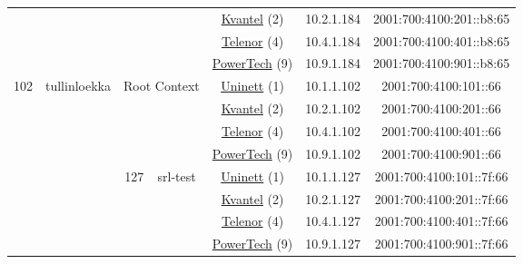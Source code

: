 \begin{small}
\begin{center}
\begin{longtable}{|c|c|c|c|c|c|c|c|}
  &  &  &  & \multicolumn{2}{|c|}{\tiny{\href{http://kvantel.no}{Kvantel} (2)}} & \tiny{10.2.1.184} & \tiny{2001:700:4100:201::b8:65} \\* \cline{5-5}\cline{6-6}\cline{7-7}\cline{8-8}
  &  &  &  & \multicolumn{2}{|c|}{\tiny{\href{https://www.telenor.no}{Telenor} (4)}} & \tiny{10.4.1.184} & \tiny{2001:700:4100:401::b8:65} \\* \cline{5-5}\cline{6-6}\cline{7-7}\cline{8-8}
  &  &  &  & \multicolumn{2}{|c|}{\tiny{\href{http://www.powertech.no}{PowerTech} (9)}} & \tiny{10.9.1.184} & \tiny{2001:700:4100:901::b8:65} \\ \hline
 \multirow{20}{*}{\tiny{102}} & \multicolumn{1}{|l|}{\multirow{20}{*}{\tiny{tullinloekka}}} & \multicolumn{2}{|c|}{\multirow{4}{*}{\tiny{Root Context}}} & \multicolumn{2}{|c|}{\tiny{\href{https://www.uninett.no}{Uninett} (1)}} & \tiny{10.1.1.102} & \tiny{2001:700:4100:101::66} \\* \cline{5-5}\cline{6-6}\cline{7-7}\cline{8-8}
  &  & \multicolumn{2}{|c|}{} & \multicolumn{2}{|c|}{\tiny{\href{http://kvantel.no}{Kvantel} (2)}} & \tiny{10.2.1.102} & \tiny{2001:700:4100:201::66} \\* \cline{5-5}\cline{6-6}\cline{7-7}\cline{8-8}
  &  & \multicolumn{2}{|c|}{} & \multicolumn{2}{|c|}{\tiny{\href{https://www.telenor.no}{Telenor} (4)}} & \tiny{10.4.1.102} & \tiny{2001:700:4100:401::66} \\* \cline{5-5}\cline{6-6}\cline{7-7}\cline{8-8}
  &  & \multicolumn{2}{|c|}{} & \multicolumn{2}{|c|}{\tiny{\href{http://www.powertech.no}{PowerTech} (9)}} & \tiny{10.9.1.102} & \tiny{2001:700:4100:901::66} \\* \cline{3-3}\cline{4-4}\cline{5-5}\cline{6-6}\cline{7-7}\cline{8-8}
  &  & \multirow{4}{*}{\tiny{127}} & \multicolumn{1}{|l|}{\multirow{4}{*}{\tiny{srl-test}}} & \multicolumn{2}{|c|}{\tiny{\href{https://www.uninett.no}{Uninett} (1)}} & \tiny{10.1.1.127} & \tiny{2001:700:4100:101::7f:66} \\* \cline{5-5}\cline{6-6}\cline{7-7}\cline{8-8}
  &  &  &  & \multicolumn{2}{|c|}{\tiny{\href{http://kvantel.no}{Kvantel} (2)}} & \tiny{10.2.1.127} & \tiny{2001:700:4100:201::7f:66} \\* \cline{5-5}\cline{6-6}\cline{7-7}\cline{8-8}
  &  &  &  & \multicolumn{2}{|c|}{\tiny{\href{https://www.telenor.no}{Telenor} (4)}} & \tiny{10.4.1.127} & \tiny{2001:700:4100:401::7f:66} \\* \cline{5-5}\cline{6-6}\cline{7-7}\cline{8-8}
  &  &  &  & \multicolumn{2}{|c|}{\tiny{\href{http://www.powertech.no}{PowerTech} (9)}} & \tiny{10.9.1.127} & \tiny{2001:700:4100:901::7f:66} \\* \cline{3-3}\cline{4-4}\cline{5-5}\cline{6-6}\cline{7-7}\cline{8-8}

\end{longtable}
\end{center}
\end{small}
